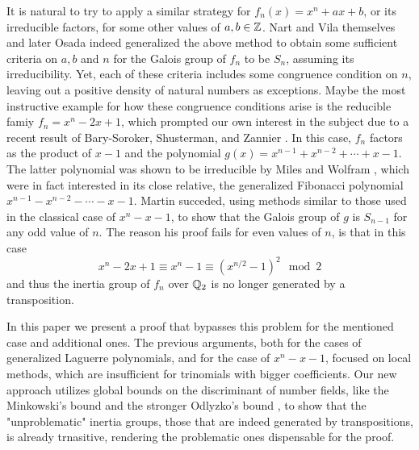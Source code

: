 \documentclass[../main.tex]{subfiles}
\begin{document}
It is natural to try to apply a similar strategy for $f_n\left( x \right) = x^n + ax + b$, or its irreducible factors, for some other values of $a,b \in \mathbb{Z}$.
Nart and Vila \cite{NartVila1979} themselves and later Osada \cite{Osada1987TheGG} indeed generalized the above method to obtain some sufficient criteria on $a,b$ and $n$ for the Galois group of $f_n$ to be $S_n$, assuming its irreducibility.
Yet, each of these criteria includes some congruence condition on $n$, leaving out a positive density of natural numbers as exceptions.
Maybe the most instructive example for how these congruence conditions arise is the  reducible famiy $f_n = x^n - 2x + 1$, which prompted our own interest in the subject due to a recent result of Bary-Soroker, Shusterman, and Zannier \cite[Appendix A]{Soroker_appendix_2017}.
In this case, $f_n$ factors as the product of $x-1$ and the polynomial $g\left( x \right) = x^{n-1} + x^{n-2} + \cdots + x - 1$.
The latter polynomial was shown to be irreducible by Miles \cite{Miles1960} and Wolfram \cite{Wolfram1998}, which were in fact interested in its close relative, the generalized Fibonacci polynomial $x^{n-1} - x^{n-2} - \cdots - x - 1$.
Martin \cite{MARTIN2004213} succeded, using methods similar to those used in the classical case of $x^n - x - 1$, to show that the Galois group of $g$ is $S_{n-1}$ for any odd value of $n$.
The reason his proof fails for even values of $n$, is that in this case 
\[
  x^n - 2x + 1 \equiv x^n - 1 \equiv \left( x^{n/2} - 1\right)^2 \mod 2
\]
and thus the inertia group of $f_n$ over $\mathbb{Q}_2$ is no longer generated by a transposition.

In this paper we present a proof that bypasses this problem for the mentioned case and additional ones.
The previous arguments, both for the cases of generalized Laguerre polynomials, and for the case of $x^n - x - 1$, focused on local methods, which are insufficient for trinomials with bigger coefficients. 
Our new approach utilizes global bounds on the discriminant of number fields, like the Minkowski's bound and the stronger Odlyzko's bound \cite{OdlyzkoBoundsII}, to show that the "unproblematic" inertia groups, those that are indeed generated by transpositions, is already trnasitive, rendering the problematic ones dispensable for the proof.
\end{document}
